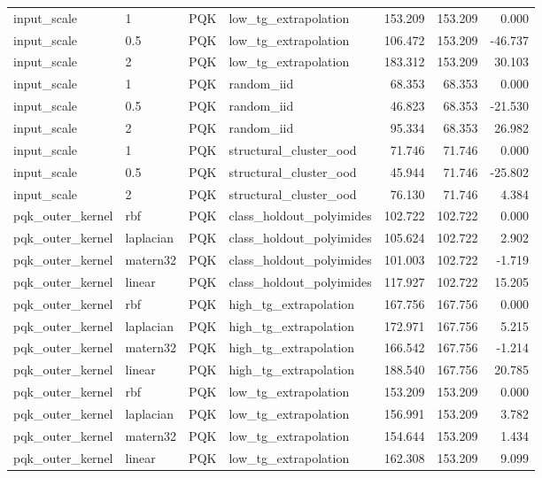 \begin{tabular}{llllrrr}
input\_scale & 1 & PQK & low\_tg\_extrapolation & 153.209 & 153.209 & 0.000 \\
input\_scale & 0.5 & PQK & low\_tg\_extrapolation & 106.472 & 153.209 & -46.737 \\
input\_scale & 2 & PQK & low\_tg\_extrapolation & 183.312 & 153.209 & 30.103 \\
input\_scale & 1 & PQK & random\_iid & 68.353 & 68.353 & 0.000 \\
input\_scale & 0.5 & PQK & random\_iid & 46.823 & 68.353 & -21.530 \\
input\_scale & 2 & PQK & random\_iid & 95.334 & 68.353 & 26.982 \\
input\_scale & 1 & PQK & structural\_cluster\_ood & 71.746 & 71.746 & 0.000 \\
input\_scale & 0.5 & PQK & structural\_cluster\_ood & 45.944 & 71.746 & -25.802 \\
input\_scale & 2 & PQK & structural\_cluster\_ood & 76.130 & 71.746 & 4.384 \\
pqk\_outer\_kernel & rbf & PQK & class\_holdout\_polyimides & 102.722 & 102.722 & 0.000 \\
pqk\_outer\_kernel & laplacian & PQK & class\_holdout\_polyimides & 105.624 & 102.722 & 2.902 \\
pqk\_outer\_kernel & matern32 & PQK & class\_holdout\_polyimides & 101.003 & 102.722 & -1.719 \\
pqk\_outer\_kernel & linear & PQK & class\_holdout\_polyimides & 117.927 & 102.722 & 15.205 \\
pqk\_outer\_kernel & rbf & PQK & high\_tg\_extrapolation & 167.756 & 167.756 & 0.000 \\
pqk\_outer\_kernel & laplacian & PQK & high\_tg\_extrapolation & 172.971 & 167.756 & 5.215 \\
pqk\_outer\_kernel & matern32 & PQK & high\_tg\_extrapolation & 166.542 & 167.756 & -1.214 \\
pqk\_outer\_kernel & linear & PQK & high\_tg\_extrapolation & 188.540 & 167.756 & 20.785 \\
pqk\_outer\_kernel & rbf & PQK & low\_tg\_extrapolation & 153.209 & 153.209 & 0.000 \\
pqk\_outer\_kernel & laplacian & PQK & low\_tg\_extrapolation & 156.991 & 153.209 & 3.782 \\
pqk\_outer\_kernel & matern32 & PQK & low\_tg\_extrapolation & 154.644 & 153.209 & 1.434 \\
pqk\_outer\_kernel & linear & PQK & low\_tg\_extrapolation & 162.308 & 153.209 & 9.099 \\

\end{tabular}
